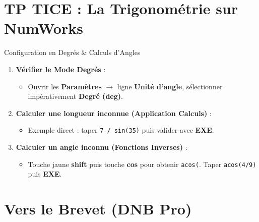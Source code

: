 \section{TP TICE : La Trigonométrie sur NumWorks}

\begin{tpinfo}{Configuration en Degrés \& Calculs d'Angles}
\begin{enumerate}[leftmargin=1.5em, itemsep=2pt]
    \item \textbf{Vérifier le Mode Degrés} :
    \begin{itemize}
        \item Ouvrir les \textbf{Paramètres} $\rightarrow$ ligne \textbf{Unité d'angle}, sélectionner impérativement \textbf{Degré (deg)}.
    \end{itemize}
    \item \textbf{Calculer une longueur inconnue (Application Calculs)} :
    \begin{itemize}
        \item Exemple direct : taper \texttt{7 / sin(35)} puis valider avec \textbf{EXE}.
    \end{itemize}
    \item \textbf{Calculer un angle inconnu (Fonctions Inverses)} :
    \begin{itemize}
        \item Touche jaune \textbf{shift} puis touche \textbf{cos} pour obtenir \texttt{acos(}. Taper \texttt{acos(4/9)} puis \textbf{EXE}.
    \end{itemize}
\end{enumerate}
\end{tpinfo}

\newpage

\section{Vers le Brevet (DNB Pro)}

